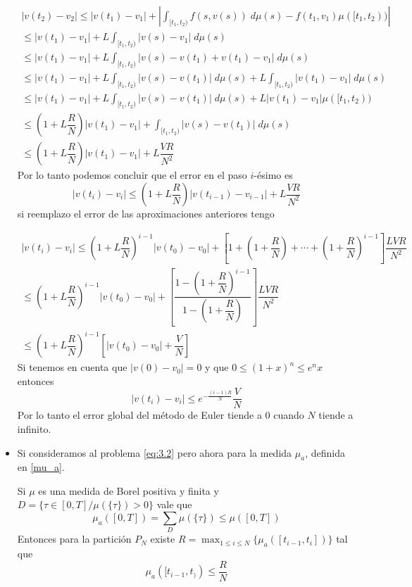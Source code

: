 \begin{itemize}
\begin{multline*}
	|v(t_2)-v_2|	\leq |v(t_1)-v_1|+\left|\int_{[t_1,t_2)}f(s,v(s))\; d\mu(s)-f(t_1,v_1)\mu([t_1,t_2))\right| \\
	\leq |v(t_1)-v_1|+L \int_{[t_1,t_2)}|v(s)-v_1|\; d\mu(s)\\
		\leq |v(t_1)-v_1|+L \int_{[t_1,t_2)}|v(s)-v(t_1)+v(t_1)-v_1|\; d\mu(s)\\
			\leq |v(t_1)-v_1|+L \int_{[t_1,t_2)}|v(s)-v(t_1)|\; d\mu(s)+L\int_{[t_1,t_2)}|v(t_1)-v_1|\; d\mu(s)\\
			\leq |v(t_1)-v_1|+L \int_{[t_1,t_2)}|v(s)-v(t_1)|\; d\mu(s)+L|v(t_1)-v_1|\mu([t_1,t_2))\\
			\leq (1+L\dfrac{R}{N})|v(t_1)-v_1|+\int_{[t_1,t_2)}|v(s)-v(t_1)|\; d\mu(s)\\
	\leq (1+L\dfrac{R}{N})|v(t_1)-v_1|+L\dfrac{VR}{N^2}
\end{multline*}
 Por lo tanto podemos concluir que el error en el paso $i$-ésimo es 
\begin{equation}
		|v(t_{i})-v_i|\leq(1+L\dfrac{R}{N})|v(t_{i-1})-v_{i-1}|+L\dfrac{VR}{N^2}
\end{equation}
si reemplazo el error de las aproximaciones anteriores tengo

\begin{multline*}
	|v(t_{i})-v_i|\leq\left( 1+L\dfrac{R}{N}\right) ^{i-1}|v(t_{0})-v_{0}|+\left[ 1+\left( 1+\dfrac{R}{N}\right) +\cdots+\left( 1+\dfrac{R}{N}\right) ^{i-1}\right] \dfrac{LVR}{N^2}\\
	\leq\left( 1+L\dfrac{R}{N}\right) ^{i-1}|v(t_{0})-v_{0}|+\left[ \dfrac{1-\left( 1+\dfrac{R}{N}\right)^{i-1} }{1-\left(1+\dfrac{R}{N} \right) }\right] \dfrac{LVR}{N^2}\\
	\leq\left( 1+L\dfrac{R}{N}\right) ^{i-1}\left[ |v(t_{0})-v_{0}|+\dfrac{V}{N}\right] 
\end{multline*}
Si tenemos en cuenta que $|v(0)-v_0|=0$ y que $0\leq (1+x)^n\leq e^nx$ entonces
\begin{equation}
	|v(t_i)-v_i|\leq e^{-\frac{(i-1)R}{N}}\dfrac{V}{N}
\end{equation}
Por lo tanto el error global del método de Euler tiende a $0$ cuando $N$ tiende a infinito.


\item Si consideramos al problema \ref{eq:3.2} pero ahora para la medida $\mu_a$, definida en \ref{mu_a}.
\begin{obs}
	Si $\mu$ es una medida de Borel positiva y finita y $D=\{\tau\in [0,T]/ \mu(\{\tau\})>0\}$ vale que
	$$\mu_a([0,T])=\sum_{D}\mu(\{\tau\})\leq \mu([0,T])$$
	 Entonces para la partición $P_N$  existe $R=\displaystyle\max_{1\leq i\leq N}\{\mu_a([t_{i-1},t_i])\}$ tal que
	 $$\mu_a([t_{i-1},t_))\leq \dfrac{R}{N}$$
	 
	
	
\end{obs}





\end{itemize}